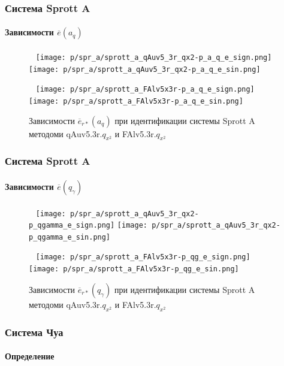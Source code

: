 \documentclass[10pt,utf8]{beamer}
\begin{document}

\begin{frame}
  \frametitle{Система Sprott A}
  \framesubtitle{Зависимости $\overline{e}(a_q)$}

  \begin{figure}[h!]
    \centerline{
      {~}\hfill
      \texttt{[image: p/spr\_a/sprott\_a\_qAuv5\_3r\_qx2-p\_a\_q\_e\_sign.png]}
      \hfill
      \texttt{[image: p/spr\_a/sprott\_a\_qAuv5\_3r\_qx2-p\_a\_q\_e\_sin.png]}
      \hfill{~}
    }
    \centerline{
      {~}\hfill
      \texttt{[image: p/spr\_a/sprott\_a\_FAlv5x3r-p\_a\_q\_e\_sign.png]}
      \hfill
      \texttt{[image: p/spr\_a/sprott\_a\_FAlv5x3r-p\_a\_q\_e\_sin.png]}
      \hfill{~}
    }
    \caption{Зависимости $\overline{e}_{r*}(a_q)$ при идентификации системы Sprott A методоми  qAuv5.3r.$q_{x^2}$ и  FAlv5.3r.$q_{x^2}$ }
    \label{atu:f:spr_a_a_q_qF.q_x2}
  \end{figure}


\end{frame}



\begin{frame}
  \frametitle{Система Sprott A}
  \framesubtitle{Зависимости $\overline{e}(q_\gamma)$}

  \begin{figure}[h!]
    \centerline{
      {~}\hfill
      \texttt{[image: p/spr\_a/sprott\_a\_qAuv5\_3r\_qx2-p\_qgamma\_e\_sign.png]}
      \hfill
      \texttt{[image: p/spr\_a/sprott\_a\_qAuv5\_3r\_qx2-p\_qgamma\_e\_sin.png]}
      \hfill{~}
    }
    \centerline{
      {~}\hfill
      \texttt{[image: p/spr\_a/sprott\_a\_FAlv5x3r-p\_qg\_e\_sign.png]}
      \hfill
      \texttt{[image: p/spr\_a/sprott\_a\_FAlv5x3r-p\_qg\_e\_sin.png]}
      \hfill{~}
    }
    \caption{Зависимости $\overline{e}_{r*}(q_\gamma)$ при идентификации системы Sprott A методоми  qAuv5.3r.$q_{x^2}$ и  FAlv5.3r.$q_{x^2}$ }
    \label{atu:f:spr_a_qg_qF.q_x2}
  \end{figure}



\end{frame}

\begin{frame}
  \frametitle{Система Чуа}
  \framesubtitle{Определение}


\end{frame}
\end{document}
